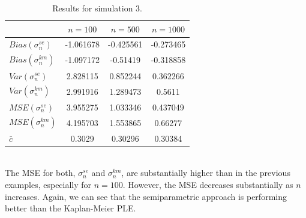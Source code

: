 \begin{table}[h!]
	\begin{center}

	\begin{tabular}{| l || c | c | c |}	
		\hline
		& $ n = 100 $ & $ n = 500 $ & $ n = 1000 $\\
		\hline
		\hline
		$Bias(\sigma_n^{se})$ & -1.061678 & -0.425561 & -0.273465\\
		$Bias(\sigma_n^{km})$ & -1.097172 & -0.51419 & -0.318858\\
		\hline
		$Var(\sigma_n^{se})$ & 2.828115 & 0.852244 & 0.362266\\
		$Var(\sigma_n^{km})$ & 2.991916 & 1.289473 & 0.5611\\
		\hline
		$MSE(\sigma_n^{se})$ & 3.955275 & 1.033346 & 0.437049\\
		$MSE(\sigma_n^{km})$ & 4.195703 & 1.553865 & 0.66277\\
		\hline
		\hline
		$\bar c$ & 0.3029 & 0.30296 & 0.30384\\
		\hline
	\end{tabular}
	\end{center}
	\caption{Results for simulation 3.}
	\label{tab:res_exppar1}
\end{table}\\
The MSE for both, $\sigma_n^{se}$ and $\sigma_n^{km}$, are substantially higher than in the previous examples, especially for $n=100$. However, the MSE decreases substantially as $n$ increases. Again, we can see that the semiparametric approach is performing better than the Kaplan-Meier PLE.
